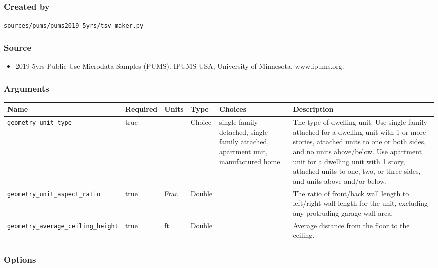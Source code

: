 \subsubsection{Created by}\label{created-by-51}

\texttt{sources/pums/pums2019\_5yrs/tsv\_maker.py}

\subsubsection{Source}\label{source-50}

\begin{itemize}
 
\item
  2019-5yrs Public Use Microdata Samples (PUMS). IPUMS USA, University
  of Minnesota, www.ipums.org.
\end{itemize}

\subsubsection{Arguments}\label{arguments-33}

\begin{longtable}[]{@{}llllll@{}}
\toprule\noalign{}
Name & Required & Units & Type & Choices & Description \\
\midrule\noalign{}
\endhead
\bottomrule\noalign{}
\endlastfoot
\texttt{geometry\_unit\_type} & true & & Choice & single-family
detached, single-family attached, apartment unit, manufactured home &
The type of dwelling unit. Use single-family attached for a dwelling
unit with 1 or more stories, attached units to one or both sides, and no
units above/below. Use apartment unit for a dwelling unit with 1 story,
attached units to one, two, or three sides, and units above and/or
below. \\
\texttt{geometry\_unit\_aspect\_ratio} & true & Frac & Double & & The
ratio of front/back wall length to left/right wall length for the unit,
excluding any protruding garage wall area. \\
\texttt{geometry\_average\_ceiling\_height} & true & ft & Double & &
Average distance from the floor to the ceiling. \\
\end{longtable}

\subsubsection{Options}\label{options-51}

